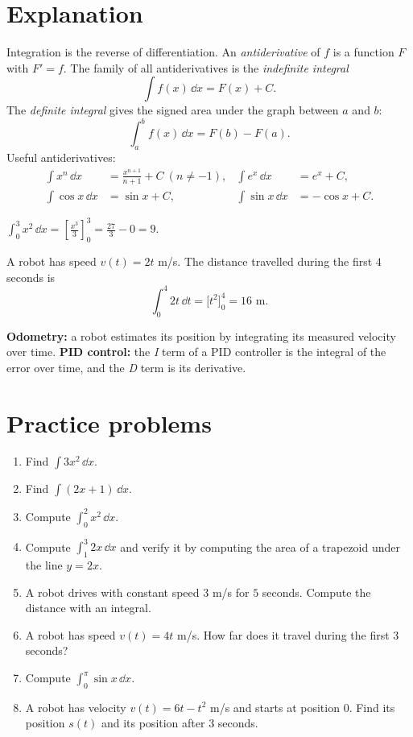 \label{ch:integrals}

\section*{Explanation}
Integration is the reverse of differentiation. An \emph{antiderivative} of $f$ is a function $F$ with $F'=f$. The family of all antiderivatives is the \emph{indefinite integral}
\[
\int f(x)\,\dd x=F(x)+C.
\]
The \emph{definite integral} gives the signed area under the graph between $a$ and $b$:
\[
\int_a^b f(x)\,\dd x=F(b)-F(a).
\]
Useful antiderivatives:
\begin{align*}
\int x^n\,\dd x&=\frac{x^{n+1}}{n+1}+C\ (n\neq-1), & \int e^x\,\dd x&=e^x+C,\\
\int\cos x\,\dd x&=\sin x+C, & \int\sin x\,\dd x&=-\cos x+C.
\end{align*}

\begin{example}
$\displaystyle\int_0^3 x^2\,\dd x=\left[\frac{x^3}{3}\right]_0^3=\frac{27}{3}-0=9.$
\end{example}

\begin{example}[Odometry]
A robot has speed $v(t)=2t$ m/s. The distance travelled during the first $4$ seconds is
\[
\int_0^4 2t\,\dd t=\bigl[t^2\bigr]_0^4=16\text{ m}.
\]
\end{example}

\begin{aibox}
\textbf{Odometry:} a robot estimates its position by integrating its measured velocity over time. \textbf{PID control:} the \emph{I} term of a PID controller is the integral of the error over time, and the \emph{D} term is its derivative.
\end{aibox}

\section*{Practice problems}
\begin{enumerate}[label=\textbf{\thechapter.\arabic*}]
  \item Find $\int 3x^2\,\dd x$.
  \item Find $\int(2x+1)\,\dd x$.
  \item Compute $\displaystyle\int_0^2 x^2\,\dd x$.
  \item Compute $\displaystyle\int_1^3 2x\,\dd x$ and verify it by computing the area of a trapezoid under the line $y=2x$.
  \item A robot drives with constant speed $3$ m/s for $5$ seconds. Compute the distance with an integral.
  \item A robot has speed $v(t)=4t$ m/s. How far does it travel during the first $3$ seconds?
  \item Compute $\displaystyle\int_0^{\pi}\sin x\,\dd x$.
  \item[\textbf{\thechapter.8}$\star$] A robot has velocity $v(t)=6t-t^2$ m/s and starts at position $0$. Find its position $s(t)$ and its position after $3$ seconds.
\end{enumerate}

\newpage
